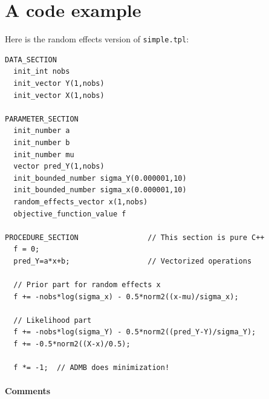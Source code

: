 \documentclass{admbmanual}
\begin{document}
\section{A code example\label{sec:code example}}

Here is the random effects version of \texttt{simple.tpl}:
\begin{lstlisting}
DATA_SECTION
  init_int nobs
  init_vector Y(1,nobs)
  init_vector X(1,nobs)

PARAMETER_SECTION
  init_number a
  init_number b
  init_number mu
  vector pred_Y(1,nobs)
  init_bounded_number sigma_Y(0.000001,10)
  init_bounded_number sigma_x(0.000001,10)
  random_effects_vector x(1,nobs)
  objective_function_value f

PROCEDURE_SECTION                // This section is pure C++
  f = 0;
  pred_Y=a*x+b;                  // Vectorized operations

  // Prior part for random effects x
  f += -nobs*log(sigma_x) - 0.5*norm2((x-mu)/sigma_x);

  // Likelihood part
  f += -nobs*log(sigma_Y) - 0.5*norm2((pred_Y-Y)/sigma_Y);
  f += -0.5*norm2((X-x)/0.5);

  f *= -1;  // ADMB does minimization!
\end{lstlisting}

\paragraph{Comments}
\end{document}
